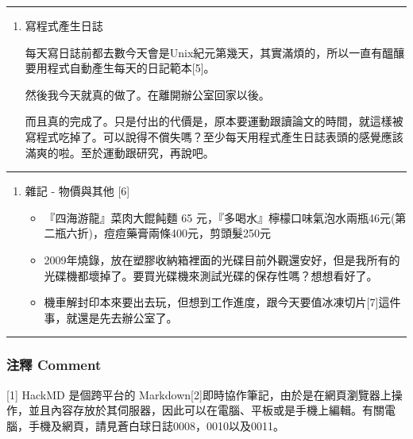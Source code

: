 \documentclass[
]{article}
\providecommand{\tightlist}{%
  \setlength{\itemsep}{0pt}\setlength{\parskip}{0pt}}
\begin{document}
\begin{center}\rule{0.5\linewidth}{\linethickness}\end{center}

\begin{enumerate}
\def\labelenumi{\arabic{enumi}.}
\setcounter{enumi}{2}
\item
  寫程式產生日誌

  每天寫日誌前都去數今天會是Unix紀元第幾天，其實滿煩的，所以一直有醞釀要用程式自動產生每天的日記範本{[}5{]}。

  然後我今天就真的做了。在離開辦公室回家以後。

  而且真的完成了。只是付出的代價是，原本要運動跟讀論文的時間，就這樣被寫程式吃掉了。可以說得不償失嗎？至少每天用程式產生日誌表頭的感覺應該滿爽的啦。至於運動跟研究，再說吧。
\end{enumerate}

\begin{center}\rule{0.5\linewidth}{\linethickness}\end{center}

\begin{enumerate}
\def\labelenumi{\arabic{enumi}.}
\setcounter{enumi}{3}
\item
  雜記 - 物價與其他 {[}6{]}

  \begin{itemize}
  \tightlist
  \item
    『四海游龍』菜肉大餛飩麵 65
    元，『多喝水』檸檬口味氣泡水兩瓶46元(第二瓶六折)，痘痘藥膏兩條400元，剪頭髮250元
  \item
    2009年燒錄，放在塑膠收納箱裡面的光碟目前外觀還安好，但是我所有的光碟機都壞掉了。要買光碟機來測試光碟的保存性嗎？想想看好了。
  \item
    機車解封印本來要出去玩，但想到工作進度，跟今天要值冰凍切片{[}7{]}這件事，就還是先去辦公室了。
  \end{itemize}
\end{enumerate}

\begin{center}\rule{0.5\linewidth}{\linethickness}\end{center}

\hypertarget{ux6ce8ux91cb-comment-7}{%
\subsubsection{注釋 Comment}\label{ux6ce8ux91cb-comment-7}}

{[}1{]} HackMD 是個跨平台的
Markdown{[}2{]}即時協作筆記，由於是在網頁瀏覽器上操作，並且內容存放於其伺服器，因此可以在電腦、平板或是手機上編輯。有關電腦，手機及網頁，請見蒼白球日誌0008，0010以及0011。
\end{document}
